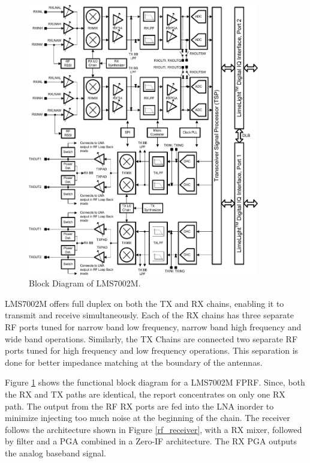 \begin{figure}[h!]
\centering
\includegraphics[width=0.9\textwidth]{Figure/Lms7002m-block-diagram.png}
\caption{Block Diagram of LMS7002M.}
\label{lms7002m}
\end{figure}

LMS7002M offers full duplex on both the TX and RX chains, enabling it to transmit and receive simultaneously.
Each of the RX chains has three separate \ac{RF} ports tuned for narrow band low frequency, narrow band high frequency and wide band operations.
Similarly, the TX Chains are connected two separate \ac{RF} ports tuned for high frequency and low frequency operations.
This separation is done for better impedance matching at the boundary of the antennas.

Figure \ref{lms7002m} shows the functional block diagram for a LMS7002M \ac{FPRF}.
Since, both the RX and TX paths are identical, the report concentrates on only one RX path.
The output from the \ac{RF} RX ports are fed into the \ac{LNA} inorder to minimize injecting too much noise at the beginning of the chain.
The receiver follows the architecture shown in Figure \ref{rf_receiver}, with a RX mixer, followed by filter and a \ac{PGA} combined in a Zero-IF architecture.
The RX \ac{PGA} outputs the analog baseband signal.\\

